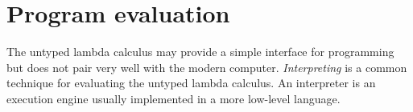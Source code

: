 \documentclass[11pt,oneside,a4paper]{report}
\begin{document}
\chapter{Program evaluation}
The untyped lambda calculus may provide a simple interface for programming but does not pair very well with the modern computer.
\textit{Interpreting} is a common technique for evaluating the untyped lambda calculus.
An interpreter is an execution engine usually implemented in a more low-level language.


\end{document}
